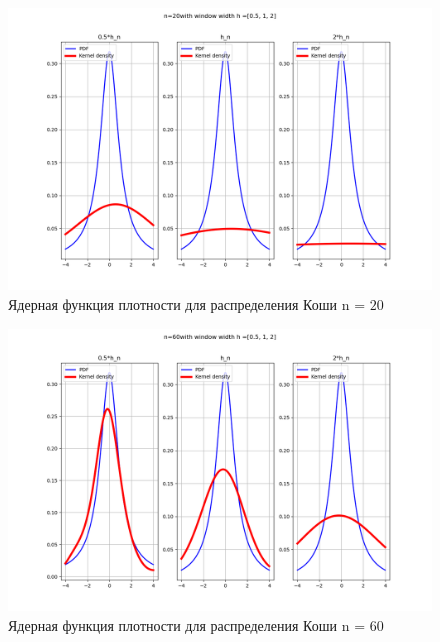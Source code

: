 \documentclass[a4]{article}
\begin{document}
\begin{center}
	\begin{figure}[H]
		\caption{Ядерная функция плотности для распределения Коши n = $20$ }
		\includegraphics[width=\textwidth]{Lab4_cauchy_pdf_20.png} 
	\end{figure}
	
	\begin{figure}[H]
		\caption{Ядерная функция плотности для распределения Коши n = $60$ }
		\includegraphics[width=\textwidth]{Lab4_cauchy_pdf_60.png} 
	\end{figure}
	

\end{center}
\end{document}

